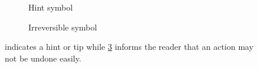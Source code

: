 \begin{figure}[h!]
	\begin{centering}
		\begin{subfigure}{0.5\textwidth}
			
			\caption{Hint symbol}\label{fig:hint_icon}
		\end{subfigure}
		\begin{subfigure}{0.5\textwidth}
			
			\caption{Irreversible symbol}\label{fig:noundo_icon}
		\end{subfigure}
	\end{centering}
	\caption{ indicates a hint or tip while \cref{fig:noundo_icon} informs the reader that an action may not be undone easily.}
\end{figure}

